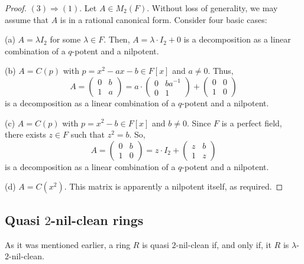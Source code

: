 \documentclass{amsart}
\theoremstyle{definition}
\theoremstyle{remark}
\numberwithin{equation}{section}
\begin{document}
\begin{proof}
\medskip

$(3) \Rightarrow (1)$. Let $A \in M_{2}(F)$. Without loss of generality, we may assume that $A$ is in a rational canonical form. Consider four basic cases:

\medskip

(a) $A = \lambda I_{2}$ for some $\lambda \in F$. Then, $A = \lambda \cdot I_{2} + 0$ is a decomposition as a linear combination of a $q$-potent and a nilpotent.

\medskip

(b) $A = C(p)$ with $p = x^{2} - ax - b \in F[x]$ and $a \not = 0$. Thus,
\[
  A =
  \left(
  \begin{array}{cc}
  0 & b
  \\
  1 & a
  \end{array}
  \right)
  =
  a \cdot
  \left(
  \begin{array}{cc}
  0 & ba^{-1}
  \\
  0 & 1
  \end{array}
  \right)
  +
  \left(
  \begin{array}{cc}
  0 & 0
  \\
  1 & 0
  \end{array}
  \right)
\]
is a decomposition as a linear combination of a $q$-potent and a nilpotent.

\medskip

(c) $A = C(p)$ with $p = x^{2} - b \in F[x]$ and $b \not = 0$. Since $F$ is a perfect field, there exists $z \in F$ such that $z^{2} = b$. So,
\[
  A =
  \left(
  \begin{array}{cc}
    0 & b
    \\
    1 & 0
  \end{array}
  \right)
  =
  z \cdot I_{2}
  +
  \left(
  \begin{array}{cc}
    z & b
    \\
    1 & z
  \end{array}
  \right)
\]
is a decomposition as a linear combination of a $q$-potent and a nilpotent.

\medskip

(d) $A = C(x^2)$. This matrix is apparently a nilpotent itself, as required.
\end{proof}

\subsection{Quasi $2$-nil-clean rings}

As it was mentioned earlier, a ring $R$ is quasi $2$-nil-clean if, and only if, it $R$ is $\lambda$-$2$-nil-clean.
\end{document}

